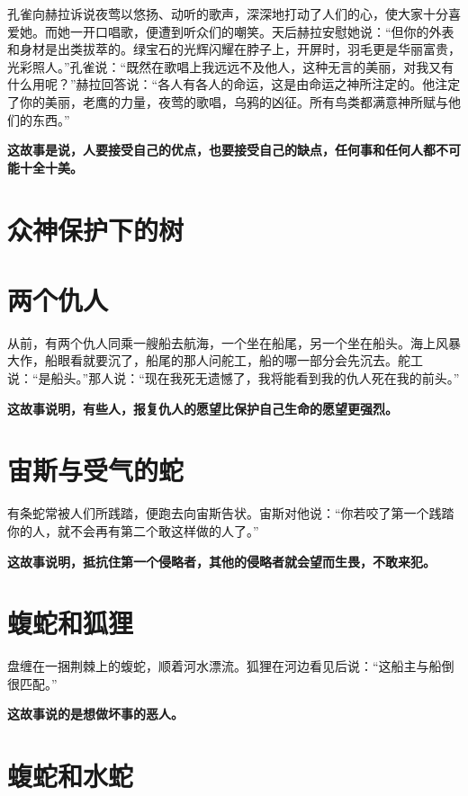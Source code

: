 孔雀向赫拉诉说夜莺以悠扬、动听的歌声，深深地打动了人们的心，使大家十分喜爱她。而她一开口唱歌，便遭到听众们的嘲笑。天后赫拉安慰她说：“但你的外表和身材是出类拔萃的。绿宝石的光辉闪耀在脖子上，开屏时，羽毛更是华丽富贵，光彩照人。”孔雀说：“既然在歌唱上我远远不及他人，这种无言的美丽，对我又有什么用呢？”赫拉回答说：“各人有各人的命运，这是由命运之神所注定的。他注定了你的美丽，老鹰的力量，夜莺的歌唱，乌鸦的凶征。所有鸟类都满意神所赋与他们的东西。”

{\bfseries \color{red}这故事是说，人要接受自己的优点，也要接受自己的缺点，任何事和任何人都不可能十全十美。}

\section{众神保护下的树}



{\bfseries \color{red}}

\section{两个仇人}

从前，有两个仇人同乘一艘船去航海，一个坐在船尾，另一个坐在船头。海上风暴大作，船眼看就要沉了，船尾的那人问舵工，船的哪一部分会先沉去。舵工说：“是船头。”那人说：“现在我死无遗憾了，我将能看到我的仇人死在我的前头。”

{\bfseries \color{red}这故事说明，有些人，报复仇人的愿望比保护自己生命的愿望更强烈。}

\section{宙斯与受气的蛇}

有条蛇常被人们所践踏，便跑去向宙斯告状。宙斯对他说：“你若咬了第一个践踏你的人，就不会再有第二个敢这样做的人了。”

{\bfseries \color{red}这故事说明，抵抗住第一个侵略者，其他的侵略者就会望而生畏，不敢来犯。}

\section{蝮蛇和狐狸}

盘缠在一捆荆棘上的蝮蛇，顺着河水漂流。狐狸在河边看见后说：“这船主与船倒很匹配。”

{\bfseries \color{red}这故事说的是想做坏事的恶人。}

\section{蝮蛇和水蛇}

